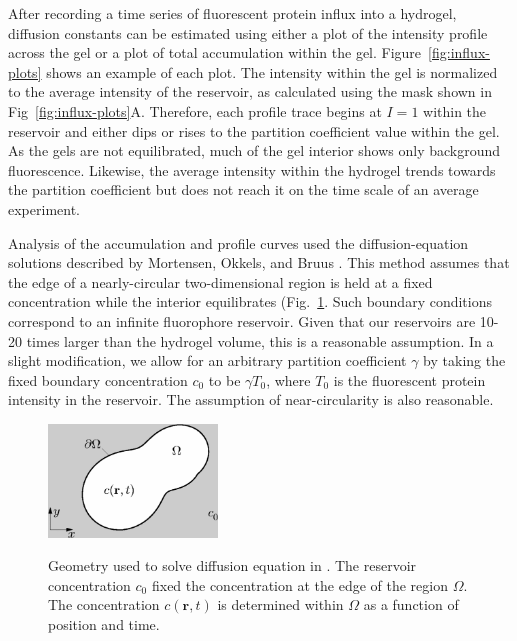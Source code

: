 After recording a time series of fluorescent protein influx into a hydrogel, diffusion constants can be estimated using either a plot of the intensity profile across the gel or a plot of total accumulation within the gel.  Figure~\ref{fig:influx-plots} shows an example of each plot.  The intensity within the gel is normalized to the average intensity of the reservoir, as calculated using the mask shown in Fig~\ref{fig:influx-plots}A.  Therefore, each profile trace begins at $I=1$ within the reservoir and either dips or rises to the partition coefficient value within the gel.  As the gels are not equilibrated, much of the gel interior shows only background fluorescence.  Likewise, the average intensity within the hydrogel trends towards the partition coefficient but does not reach it on the time scale of an average experiment.

Analysis of the accumulation and profile curves used the diffusion-equation solutions described by Mortensen, Okkels, and Bruus \cite{mortensen06}.  This method assumes that the edge of  a nearly-circular two-dimensional region is held at a fixed concentration while the interior equilibrates (Fig.~\ref{fig:mortensen}.  Such boundary conditions correspond to an infinite fluorophore reservoir.  Given that our reservoirs are 10-20 times larger than the hydrogel volume, this is a reasonable assumption.  In a slight modification, we allow for an arbitrary partition coefficient $\gamma$ by taking the fixed boundary concentration $c_0$ to be $\gamma T_0$, where $T_0$ is the fluorescent protein intensity in the reservoir.  The assumption of near-circularity is also reasonable.

\begin{figure}
\caption[Geometry of profile and accumulation model.]{Geometry used to solve diffusion equation in \cite{mortensen06}.  The reservoir concentration $c_0$ fixed the concentration at the edge of the region $\Omega$.  The concentration $c(\mathbf{r},t)$ is determined within $\Omega$ as a function of position and time.}
\centering
\includegraphics[width=0.4\textwidth]{figs/ch04/mortensen}
\label{fig:mortensen}
\end{figure}

